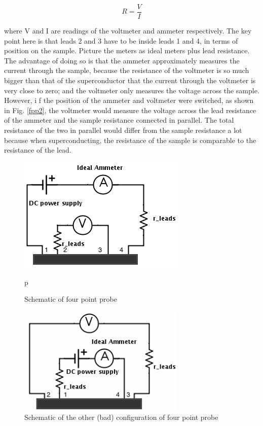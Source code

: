 \documentclass[prb,preprint]{revtex4-1}
\begin{document}
\begin{equation}
R=\frac{V}{I}
\label{ohm}
\end{equation}

where V and I are readings of the voltmeter and ammeter respectively. The key point here is that leads 2 and 3 have to be inside leads 1 and 4, in terms of position on the sample. Picture the meters as ideal meters plus lead resistance. The advantage of doing so is that the ammeter approximately measures the current through the sample, because the resistance of the voltmeter is so much bigger than that of the superconductor that the current through the voltmeter is very close to zero; and the voltmeter only measures the voltage across the sample. However, i f the position of the ammeter and voltmeter were switched, as shown in Fig. \ref{fpp2}, the voltmeter would measure the voltage across the lead resistance of the ammeter and the sample resistance connected in parallel. The total resistance of the two in parallel would differ from the sample resistance a lot because when superconducting, the resistance of the sample is comparable to the resistance of the lead. \\

\begin{figure}[h]
\centering
\includegraphics[width=8cm]{fourpointprobe2.png}
\caption{Schematic of four point probe}
\label{fp}p
\end{figure}

\begin{figure}[h]
\centering
\includegraphics[width=8cm]{fourpointprobe3.png}
\caption{Schematic of the other (bad) configuration of four point probe}
\label{fpp}
\end{figure}
\end{document}
